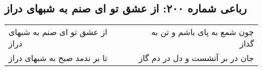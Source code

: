 \begin{center}
\section*{رباعی شماره ۲۰۰: از عشق تو ای صنم به شبهای دراز}
\label{sec:sh200}
\begin{longtable}{l p{0.5cm} r}
از عشق تو ای صنم به شبهای دراز
&&
چون شمع به پای باشم و تن به گداز
\\
تا بر ندمد صبح به شبهای دراز
&&
جان در بر آتشست و دل در دم گاز
\\
\end{longtable}
\end{center}
